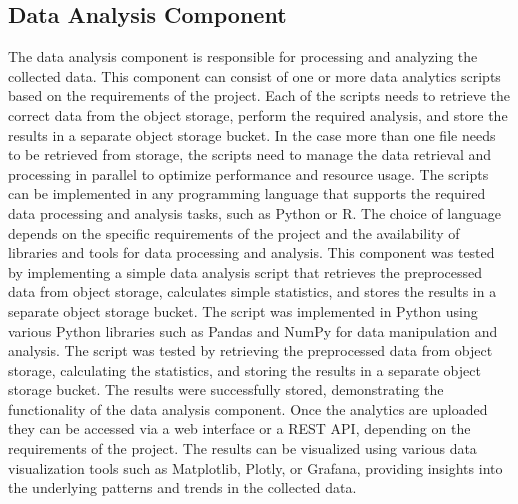 \subsection{Data Analysis Component}
The data analysis component is responsible for processing and analyzing the collected data. This component can consist of one or more data analytics scripts based on the requirements of the project. Each of the scripts needs to retrieve the correct data from the object storage, perform the required analysis, and store the results in a separate object storage bucket. In the case more than one file needs to be retrieved from storage, the scripts need to manage the data retrieval and processing in parallel to optimize performance and resource usage. The scripts can be implemented in any programming language that supports the required data processing and analysis tasks, such as Python or R. The choice of language depends on the specific requirements of the project and the availability of libraries and tools for data processing and analysis.
This component was tested by implementing a simple data analysis script that retrieves the preprocessed data from object storage, calculates simple statistics, and stores the results in a separate object storage bucket. The script was implemented in Python using various Python libraries such as Pandas and NumPy for data manipulation and analysis. The script was tested by retrieving the preprocessed data from object storage, calculating the statistics, and storing the results in a separate object storage bucket. The results were successfully stored, demonstrating the functionality of the data analysis component.
Once the analytics are uploaded they can be accessed via a web interface or a REST API, depending on the requirements of the project. The results can be visualized using various data visualization tools such as Matplotlib, Plotly, or Grafana, providing insights into the underlying patterns and trends in the collected data.
